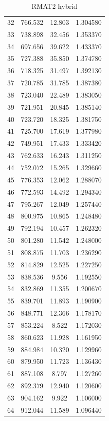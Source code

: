 \documentclass[10pt,twocolumn,letterpaper]{article}
\begin{document}
\begin{table}[h]
\begin{tabular}{@{}c|ccc@{}}
32 & 766.532 & 12.803 & 1.304580 \\
33 & 738.898 & 32.456 & 1.353370 \\
34 & 697.656 & 39.622 & 1.433370 \\
35 & 727.388 & 35.850 & 1.374780 \\
36 & 718.325 & 31.497 & 1.392130 \\
37 & 720.785 & 31.785 & 1.387380 \\
38 & 723.040 & 22.489 & 1.383050 \\
39 & 721.951 & 20.845 & 1.385140 \\
40 & 723.720 & 18.325 & 1.381750 \\
41 & 725.700 & 17.619 & 1.377980 \\
42 & 749.951 & 17.433 & 1.333420 \\
43 & 762.633 & 16.243 & 1.311250 \\
44 & 752.072 & 15.265 & 1.329660 \\
45 & 776.353 & 12.062 & 1.288070 \\
46 & 772.593 & 14.492 & 1.294340 \\
47 & 795.267 & 12.049 & 1.257440 \\
48 & 800.975 & 10.865 & 1.248480 \\
49 & 792.194 & 10.457 & 1.262320 \\
50 & 801.280 & 11.542 & 1.248000 \\
51 & 808.875 & 11.703 & 1.236290 \\
52 & 814.829 & 12.525 & 1.227250 \\
53 & 838.536 & 9.556 & 1.192550 \\
54 & 832.869 & 11.355 & 1.200670 \\
55 & 839.701 & 11.893 & 1.190900 \\
56 & 848.771 & 12.366 & 1.178170 \\
57 & 853.224 & 8.522 & 1.172030 \\
58 & 860.623 & 11.928 & 1.161950 \\
59 & 884.984 & 10.320 & 1.129960 \\
60 & 879.950 & 11.723 & 1.136430 \\
61 & 887.108 & 8.797 & 1.127260 \\
62 & 892.379 & 12.940 & 1.120600 \\
63 & 904.162 & 9.922 & 1.106000 \\
64 & 912.044 & 11.589 & 1.096440 \\
\bottomrule
\end{tabular}
\caption{RMAT2 hybrid}
\end{table}
\end{document}
